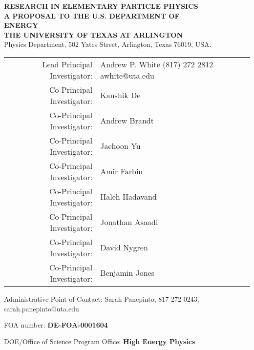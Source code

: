 \newpage
\begin{center}


{\Large\bf RESEARCH IN ELEMENTARY PARTICLE PHYSICS}  \\
\vspace{.75in}
{\Large\bf A PROPOSAL TO THE U.S. DEPARTMENT OF} \\
\vspace*{0.15in}
{\Large\bf  ENERGY} \\
\vspace{0.5in}
{\Large\bf THE UNIVERSITY OF TEXAS AT ARLINGTON} \\
Physics Department, 502 Yates Street, Arlington, Texas 76019, USA.

\vspace{0.5in}
%
\begin{table}[htb]
\centering
\renewcommand{\arraystretch}{1.15}
\begin{tabular}{rl} %
    Lead Principal Investigator:    & Andrew P. White  (817) 272 2812 awhite@uta.edu   \\
    Co-Principal Investigator:   & Kaushik De                       \\
    Co-Principal Investigator:   & Andrew Brandt                    \\
    Co-Principal Investigator:   & Jaehoon Yu                       \\
    Co-Principal Investigator:   & Amir Farbin                      \\
	Co-Principal Investigator:   & Haleh Hadavand                   \\
	Co-Principal Investigator:   & Jonathan Asaadi                  \\
	Co-Principal Investigator:   & David Nygren                     \\
	Co-Principal Investigator:   & Benjamin Jones                   \\

	\end{tabular}
\renewcommand{\arraystretch}{1.0}
\end{table}

Administrative Point of Contact: Sarah Panepinto, 817 272 0243, sarah.panepinto@uta.edu
\vspace*{0.15in}

FOA number:  \textbf{DE-FOA-0001604}
\vspace*{0.15in}

DOE/Office of Science Program Office: \textbf{High Energy Physics}
\vspace*{0.15in}


\end{center}
